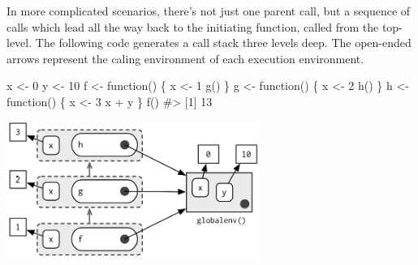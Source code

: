 \documentclass[oneside]{book}
\newenvironment{Shaded}{}{}
\newcommand{\KeywordTok} [1]{\textcolor[rgb]{0.00,0.44,0.13}{{#1}}}
\newcommand{\DataTypeTok}[1]{\textcolor[rgb]{0.56,0.13,0.00}{{#1}}}
\newcommand{\DecValTok}  [1]{\textcolor[rgb]{0.25,0.63,0.44}{{#1}}}
\newcommand{\StringTok}  [1]{\textcolor[rgb]{0.25,0.44,0.63}{{#1}}}
\newcommand{\CommentTok} [1]{\textcolor[rgb]{0.38,0.63,0.69}{{#1}}}
\newcommand{\NormalTok}  [1]{{#1}}
\begin{document}
\begin{Shaded}
\end{Shaded}

In more complicated scenarios, there's not just one parent call, but a
sequence of calls which lead all the way back to the initiating
function, called from the top-level. The following code generates a call
stack three levels deep. The open-ended arrows represent the caling
environment of each execution environment.

\begin{Shaded}
\begin{Highlighting}[]
\NormalTok{x <-}\StringTok{ }\DecValTok{0}
\NormalTok{y <-}\StringTok{ }\DecValTok{10}
\NormalTok{f <-}\StringTok{ }\NormalTok{function() \{}
  \NormalTok{x <-}\StringTok{ }\DecValTok{1}
  \KeywordTok{g}\NormalTok{()}
\NormalTok{\}}
\NormalTok{g <-}\StringTok{ }\NormalTok{function() \{}
  \NormalTok{x <-}\StringTok{ }\DecValTok{2}
  \KeywordTok{h}\NormalTok{()}
\NormalTok{\}}
\NormalTok{h <-}\StringTok{ }\NormalTok{function() \{}
  \NormalTok{x <-}\StringTok{ }\DecValTok{3}
  \NormalTok{x +}\StringTok{ }\NormalTok{y}
\NormalTok{\}}
\KeywordTok{f}\NormalTok{()}
\CommentTok{#> [1] 13}
\end{Highlighting}
\end{Shaded}

\includegraphics[width=3.25in,height=1.77in]{diagrams/environments.png/calling.png}
\end{document}
